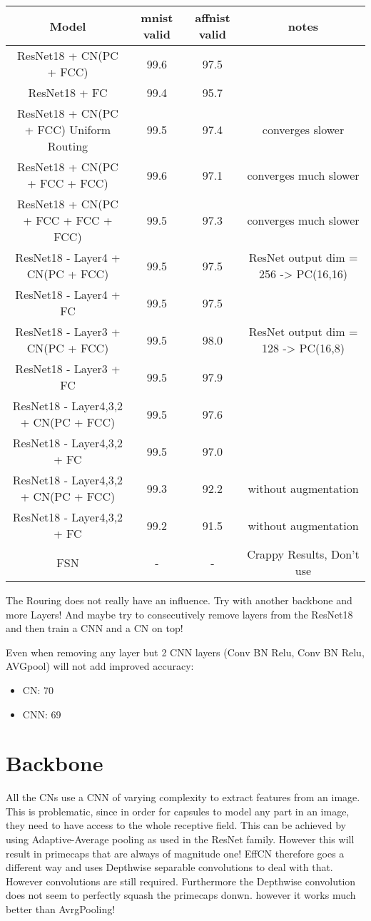 \documentclass{article}
\begin{document}
\begin{center}
	\begin{tabular}{ c c c c}
		Model & mnist valid & affnist valid & notes \\
		\hline
		ResNet18 + CN(PC + FCC) & 99.6 & 97.5 &  \\
		ResNet18 + FC & 99.4 & 95.7 & \\
		ResNet18 + CN(PC + FCC) Uniform Routing & 99.5 & 97.4 & converges slower \\
		ResNet18 + CN(PC + FCC + FCC) & 99.6 & 97.1 & converges much slower \\
		ResNet18 + CN(PC + FCC + FCC + FCC) & 99.5 & 97.3 & converges much slower \\
		ResNet18 - Layer4 + CN(PC + FCC) & 99.5 & 97.5 & ResNet output dim = 256 -> PC(16,16) \\
		ResNet18 - Layer4 + FC & 99.5  & 97.5 &  \\
		ResNet18 - Layer3 + CN(PC + FCC) & 99.5  & 98.0  & ResNet output dim = 128 -> PC(16,8) \\
		ResNet18 - Layer3 + FC & 99.5  & 97.9  &  \\
		ResNet18 - Layer4,3,2 + CN(PC + FCC)  & 99.5 & 97.6 & \\
		ResNet18 - Layer4,3,2 + FC & 99.5 & 97.0 & \\
		ResNet18 - Layer4,3,2 + CN(PC + FCC)  & 99.3 & 92.2 & without augmentation \\
		ResNet18 - Layer4,3,2 + FC & 99.2 & 91.5 & without augmentation \\
		FSN & - & - & Crappy Results, Don't use \\
	\end{tabular}
\end{center}

The Rouring does not really have an influence. Try with another backbone and more Layers!
And maybe try to consecutively remove layers from the ResNet18 and then train a CNN and a CN on top!

Even when removing any layer but 2 CNN layers (Conv BN Relu, Conv BN Relu, AVGpool) will not add improved accuracy:
\begin{itemize}
	\item CN: 70
	\item CNN: 69
\end{itemize}

\section{Backbone}
All the CNs use a CNN of varying complexity to extract features from an image. This is problematic, since in order for capsules to model any part in an image, they need to have access to the whole receptive field. This can be achieved by using Adaptive-Average pooling as used in the ResNet family. However this will result in primecaps that are always of magnitude one!
EffCN therefore goes a different way and uses Depthwise separable convolutions to deal with that. However convolutions are still required. Furthermore the Depthwise convolution does not seem to perfectly squash the primecaps donwn. however it works much better than AvrgPooling!
\end{document}
